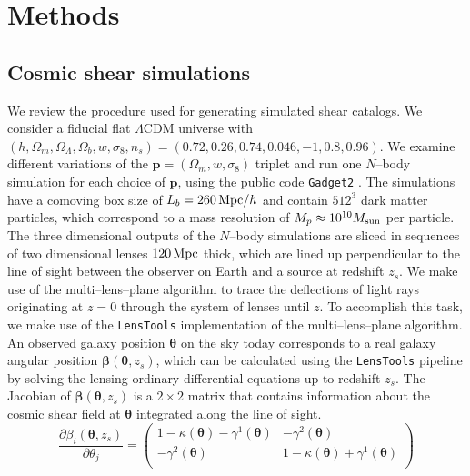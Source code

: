 \documentclass[reprint,aps,prd,superscriptaddress,showkeys,showpacs]{revtex4-1}
\newcommand{\bb}[1]{\mathbf{#1}}
\newcommand{\ttt}[1]{\texttt{#1}}
\begin{document}
\section{Methods}


\subsection{Cosmic shear simulations}
\label{sec:shearsim}
We review the procedure used for generating simulated shear catalogs. We consider a fiducial flat $\Lambda$CDM universe with $(h,\Omega_m,\Omega_\Lambda,\Omega_b,w,\sigma_8,n_s)=(0.72,0.26,0.74,0.046,-1,0.8,0.96)$. We examine different variations of the $\bb{p}=(\Omega_m,w,\sigma_8)$ triplet and run one $N$--body simulation for each choice of $\bb{p}$, using the public code \ttt{Gadget2} \citep{Gadget2}. The simulations have a comoving box size of $L_b=260\,{\rm Mpc}/h$ and contain $512^3$ dark matter particles, which correspond to a mass resolution of $M_p\approx 10^{10}M_{\rm sun}$ per particle. The three dimensional outputs of the $N$--body simulations are sliced in sequences of two dimensional lenses $120 \,{\rm Mpc}$ thick, which are lined up perpendicular to the line of sight between the observer on Earth and a source at redshift $z_s$. We make use of the multi--lens--plane algorithm \citep{RayTracingJain,RayTracingHartlap} to trace the deflections of light rays originating at $z=0$ through the system of lenses until $z$. To accomplish this task, we make use of the \ttt{LensTools} \citep{LensTools-ASCL,LensTools-paper} implementation of the multi--lens--plane algorithm. An observed galaxy position $\pmb{\theta}$ on the sky today corresponds to a real galaxy angular position $\pmb{\beta}(\pmb{\theta},z_s)$, which can be calculated using the \ttt{LensTools} pipeline by solving the lensing ordinary differential equations up to redshift $z_s$. The Jacobian of $\pmb{\beta}(\pmb{\theta},z_s)$ is a $2\times 2$ matrix that contains information about the cosmic shear field at $\pmb{\theta}$ integrated along the line of sight. 
%
\begin{equation}
\label{meth:sheareqn}
\frac{\partial\beta_i(\pmb{\theta},z_s)}{\partial \theta_j} = 
\begin{pmatrix}
1-\kappa(\pmb{\theta})-\gamma^1(\pmb{\theta}) & -\gamma^2(\pmb{\theta}) \\
-\gamma^2(\pmb{\theta}) & 1-\kappa(\pmb{\theta})+\gamma^1(\pmb{\theta})\\
\end{pmatrix}
\end{equation}  
\end{document}
